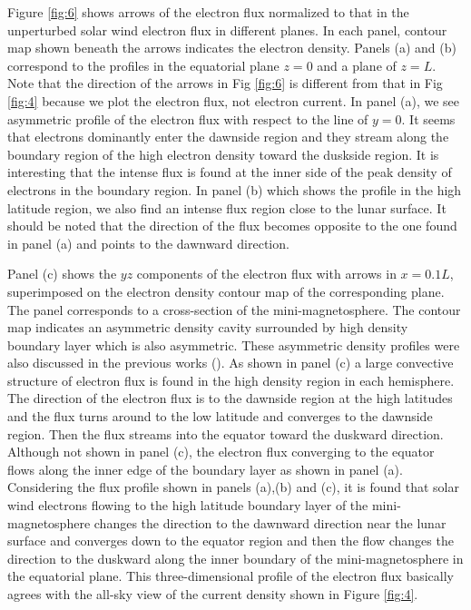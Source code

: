 \documentclass[draft,jgrga]{agutex2015}
\begin{document}
\begin{article}
Figure \ref{fig:6} shows arrows of the electron flux 
normalized to that in the unperturbed solar wind electron flux in different planes.
In each panel, contour map shown beneath the arrows indicates the electron density.
Panels (a) and (b) correspond to the profiles 
in the equatorial plane $z=0$ and a plane of $z=L$. 
Note that the direction of the arrows in Fig \ref{fig:6} is
different from that in Fig \ref{fig:4} because 
we plot the electron flux, not electron current.
In panel (a),  
we see asymmetric profile of the electron flux 
with respect to the line of $y=0$.
It seems that electrons dominantly enter the dawnside region 
and they stream along the boundary region of the high electron density
toward the duskside region.
It is interesting that the intense flux is found at the inner side of 
the peak density of electrons in the boundary region.
In panel (b) which shows the profile in the high latitude region, 
we also find an intense flux region close to the lunar surface.
It should be noted that the direction of the flux becomes 
opposite to the one found in panel (a) and points to the dawnward direction.

Panel (c) shows the $yz$ components of the electron flux 
with arrows in $x=0.1L$, 
superimposed on the electron density contour map of the corresponding plane.
The panel corresponds to a cross-section of the mini-magnetosphere.
The contour map indicates an asymmetric density cavity 
surrounded by high density boundary layer which is also asymmetric.
These asymmetric density profiles were also discussed in the previous works
(\cite{Deca2014}).
As shown in panel (c)
a large convective structure of electron flux is found 
in the high density region in each hemisphere.
The direction of the electron flux is to the dawnside region at the high latitudes and
the flux turns around to the low latitude and converges to the dawnside region.
Then the flux streams into the equator toward the duskward direction.
Although not shown in panel (c), 
the electron flux converging to the equator flows 
along the inner edge of the boundary layer as shown in panel (a).
Considering the flux profile shown in panels (a),(b) and (c), 
it is found that solar wind electrons flowing 
to the high latitude boundary layer of the mini-magnetosphere
changes the direction to the dawnward direction 
near the lunar surface and converges down to the equator region 
and then the flow changes the direction to the duskward
along the inner boundary of the mini-magnetosphere in the equatorial plane.
This three-dimensional profile of the electron flux basically 
agrees with the all-sky view of the current density shown in Figure \ref{fig:4}.


\end{article}
\end{document}
